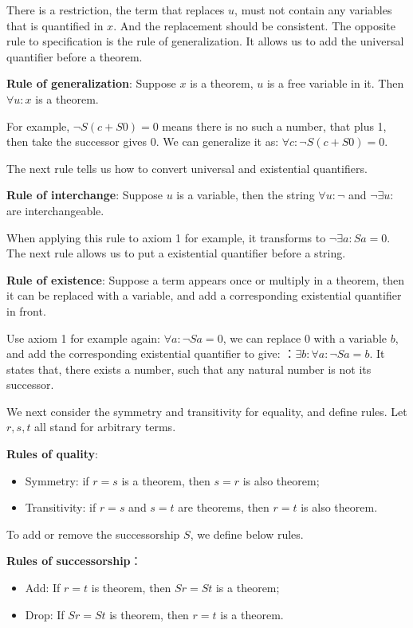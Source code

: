 \documentclass[b5paper]{article}
\begin{document}
There is a restriction, the term that replaces $u$, must not contain any variables that is quantified in $x$. And the replacement should be consistent. The opposite rule to specification is the rule of generalization. It allows us to add the universal quantifier before a theorem.

\textbf{Rule of generalization}: Suppose $x$ is a theorem, $u$ is a free variable in it. Then $\forall u: x$ is a theorem.

For example, $\lnot S(c + S0) = 0$ means there is no such a number, that plus 1, then take the successor gives 0. We can generalize it as: $\forall c: \lnot S(c + S0) = 0$.

The next rule tells us how to convert universal and existential quantifiers.

\textbf{Rule of interchange}: Suppose $u$ is a variable, then the string $\forall u: \lnot $ and $\lnot \exists u:$ are interchangeable.

When applying this rule to axiom 1 for example, it transforms to $\lnot \exists a: Sa = 0$. The next rule allows us to put a existential quantifier before a string.

\textbf{Rule of existence}: Suppose a term appears once or multiply in a theorem, then it can be replaced with a variable, and add a corresponding existential quantifier in front.

Use axiom 1 for example again: $\forall a: \lnot Sa = 0$, we can replace 0 with a variable $b$, and add the corresponding existential quantifier to give: ：$\exists b: \forall a: \lnot Sa = b$. It states that, there exists a number, such that any natural number is not its successor.

We next consider the symmetry and transitivity for equality, and define rules. Let $r, s, t$ all stand for arbitrary terms.

\textbf{Rules of quality}:
\begin{itemize}
\item Symmetry: if $r = s$ is a theorem, then $s = r$ is also theorem;
\item Transitivity: if $r = s$ and $s = t$ are theorems, then $r = t$ is also theorem.
\end{itemize}

To add or remove the successorship $S$, we define below rules.

\textbf{Rules of successorship}：
\begin{itemize}
\item Add: If $r = t$ is theorem, then $Sr = St$ is a theorem;
\item Drop: If $Sr = St$ is theorem, then $r = t$ is a theorem.
\end{itemize}
\end{document}
